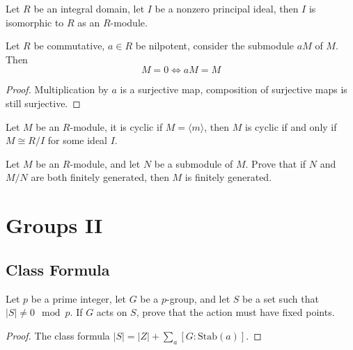 \documentclass[openany]{book}
\newcommand{\la}{\langle}
\newcommand{\ra}{\rangle}
\begin{document}
\begin{prop}[5.13]
    Let $R$ be an integral domain, let $I$ be a nonzero principal ideal, then $I$ is isomorphic to $R$ as an $R$-module.
\end{prop}

\begin{prop}[5.16]
    Let $R$ be commutative, $a\in R$ be nilpotent, consider the submodule $aM$ of $M$. Then 
    \begin{equation*}
        M=0\iff aM=M
    \end{equation*}
\end{prop}
\begin{proof}
    Multiplication by $a$ is a surjective map, composition of surjective maps is still surjective.
\end{proof}


\begin{prop}[6.16]
    Let $M$ be an $R$-module, it is cyclic if $M=\la m\ra$, then $M$ is cyclic if and only if $M\cong R/I$ for some ideal $I$.
\end{prop}

\begin{prop}[6.18]
    Let \( M \) be an \( R \)-module, and let \( N \) be a submodule of \( M \). Prove that if \( N \) and \( M/N \) are both finitely generated, then \( M \) is finitely generated.
\end{prop}






\chapter{Groups II}

\section{Class Formula}
\begin{prob}
Let $p$ be a prime integer, let $G$ be a $p$-group, and let $S$ be a set such that $|S| \neq 0 \mod p$. If $G$ acts on $S$, prove that the action must have fixed points. 
\end{prob}
\begin{proof}
    The class formula $|S|=|Z|+\sum_a[G:\text{Stab}(a)]$.
\end{proof}
\end{document}
